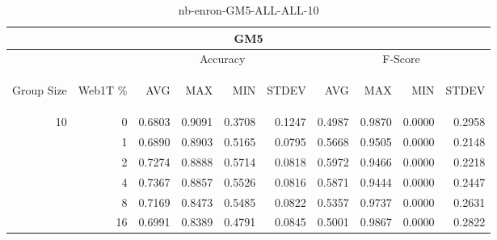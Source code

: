 \begin{center}
\begin{table}[htbp] 
 \begin{center}
\begin{tabular}{ | r | r | r | r | r | r | r | r | r | r |}
\hline
\multicolumn{10}{|c|}{GM5}\\
\hline
 & & \multicolumn{4}{|c|}{Accuracy} & \multicolumn{4}{|c|}{F-Score}\\ \cline{3-10}
\begin{sideways}Group Size\end{sideways} & \begin{sideways}Web1T \%\end{sideways} & \begin{sideways}AVG\end{sideways} & \begin{sideways}MAX\end{sideways} & \begin{sideways}MIN\end{sideways} & \begin{sideways}STDEV\end{sideways} & \begin{sideways}AVG\end{sideways} & \begin{sideways}MAX\end{sideways} & \begin{sideways}MIN\end{sideways} & \begin{sideways}STDEV\end{sideways}\\
\hline
\multirow{5}{*}{10}
 & 0 & 0.6803 & 0.9091 & 0.3708 & 0.1247 & 0.4987 & 0.9870 & 0.0000 & 0.2958\\ \cline{2-10}
 & 1 & 0.6890 & 0.8903 & 0.5165 & 0.0795 & 0.5668 & 0.9505 & 0.0000 & 0.2148\\ \cline{2-10}
 & 2 & 0.7274 & 0.8888 & 0.5714 & 0.0818 & 0.5972 & 0.9466 & 0.0000 & 0.2218\\ \cline{2-10}
 & 4 & 0.7367 & 0.8857 & 0.5526 & 0.0816 & 0.5871 & 0.9444 & 0.0000 & 0.2447\\ \cline{2-10}
 & 8 & 0.7169 & 0.8473 & 0.5485 & 0.0822 & 0.5357 & 0.9737 & 0.0000 & 0.2631\\ \cline{2-10}
 & 16 & 0.6991 & 0.8389 & 0.4791 & 0.0845 & 0.5001 & 0.9867 & 0.0000 & 0.2822\\ \cline{2-10}
\hline
\end{tabular}
\caption{nb-enron-GM5-ALL-ALL-10}
\label{table:nb-enron-GM5-ALL-ALL-10}
\end{center}
 \end{table}
\end{center}

